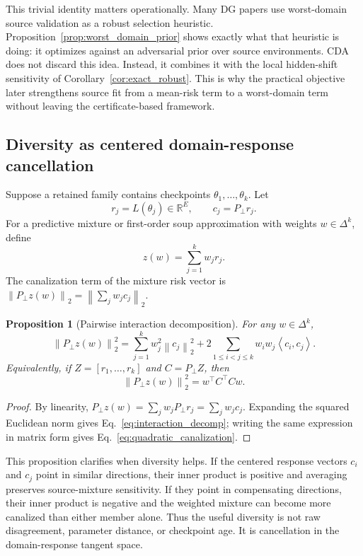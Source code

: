 \documentclass{article}
\newtheorem{proposition}[theorem]{Proposition}
\theoremstyle{definition}
\newcommand{\RR}{\mathbb{R}}
\newcommand{\simplex}{\Delta}
\newcommand{\norm}[1]{\left\lVert #1 \right\rVert}
\newcommand{\inner}[2]{\left\langle #1, #2 \right\rangle}
\begin{document}
This trivial identity matters operationally. Many DG papers use worst-domain source validation as a robust selection heuristic. Proposition~\ref{prop:worst_domain_prior} shows exactly what that heuristic is doing: it optimizes against an adversarial prior over source environments. CDA does not discard this idea. Instead, it combines it with the local hidden-shift sensitivity of Corollary~\ref{cor:exact_robust}. This is why the practical objective later strengthens source fit from a mean-risk term to a worst-domain term without leaving the certificate-based framework.

\subsection{Diversity as centered domain-response cancellation}

Suppose a retained family contains checkpoints \(\theta_1,\dots,\theta_k\). Let
\[
r_j=L(\theta_j)\in\RR^E,\qquad c_j=P_\perp r_j.
\]
For a predictive mixture or first-order soup approximation with weights \(w\in\simplex^k\), define
\[
z(w)=\sum_{j=1}^k w_j r_j.
\]
The canalization term of the mixture risk vector is \(\norm{P_\perp z(w)}_2=\norm{\sum_j w_j c_j}_2\).

\begin{proposition}[Pairwise interaction decomposition]
\label{prop:interaction}
For any \(w\in\simplex^k\),
\begin{equation}
\norm{P_\perp z(w)}_2^2
=
\sum_{j=1}^k w_j^2\norm{c_j}_2^2
+2\sum_{1\le i<j\le k}w_iw_j\inner{c_i}{c_j}.
\label{eq:interaction_decomp}
\end{equation}
Equivalently, if \(Z=[r_1,\dots,r_k]\) and \(C=P_\perp Z\), then
\begin{equation}
\norm{P_\perp z(w)}_2^2=w^\top C^\top Cw.
\label{eq:quadratic_canalization}
\end{equation}
\end{proposition}

\begin{proof}
By linearity, \(P_\perp z(w)=\sum_j w_j P_\perp r_j=\sum_j w_jc_j\). Expanding the squared Euclidean norm gives Eq.~\eqref{eq:interaction_decomp}; writing the same expression in matrix form gives Eq.~\eqref{eq:quadratic_canalization}.
\end{proof}

This proposition clarifies when diversity helps. If the centered response vectors \(c_i\) and \(c_j\) point in similar directions, their inner product is positive and averaging preserves source-mixture sensitivity. If they point in compensating directions, their inner product is negative and the weighted mixture can become more canalized than either member alone. Thus the useful diversity is not raw disagreement, parameter distance, or checkpoint age. It is cancellation in the domain-response tangent space.
\end{document}
